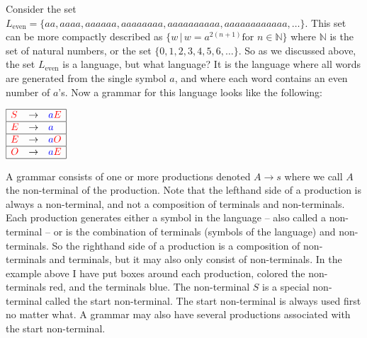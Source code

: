 \documentclass{article}
\begin{document}
Consider the set $L_{\text{even}} = \{
aa,aaaa,aaaaaa,aaaaaaaa,aaaaaaaaaa,aaaaaaaaaaaa,\ldots\}$.  This set
can be more compactly described as $\{w \,|\, w = a^{2(n+1)} \text{
  for } n \in \mathbb{N}\}$ where $\mathbb{N}$ is the set of natural
numbers, or the set $\{0,1,2,3,4,5,6,\ldots\}$.  So as we discussed
above, the set $L_{\text{even}}$ is a language, but what language?  It
is the language where all words are generated from the single symbol
$a$, and where each word contains an even number of $a$'s.  Now a
grammar for this language looks like the following:
\begin{center}
  \begin{math}
    \begin{array}{|lll|}
      \hline
      \color{red}{S} & \to & \color{blue}{a}\color{red}{E}\\
      \hline
      \color{red}{E} & \to & \color{blue}{a}\\
      \hline
      \color{red}{E} & \to & \color{blue}{a}\color{red}{O}\\
      \hline
      \color{red}{O} & \to & \color{blue}{a}\color{red}{E}\\
      \hline
    \end{array}
  \end{math}
\end{center}
A grammar consists of one or more productions denoted $A \to s$ where
we call $A$ the non-terminal of the production.  Note that the
lefthand side of a production is always a non-terminal, and not a
composition of terminals and non-terminals.  Each production generates
either a symbol in the language -- also called a non-terminal -- or is
the combination of terminals (symbols of the language) and
non-terminals.  So the righthand side of a production is a composition
of non-terminals and terminals, but it may also only consist of
non-terminals.  In the example above I have put boxes around each
production, colored the non-terminals red, and the terminals blue.
The non-terminal $S$ is a special non-terminal called the start
non-terminal.  The start non-terminal is always used first no matter
what.  A grammar may also have several productions associated with the
start non-terminal.
\end{document}
